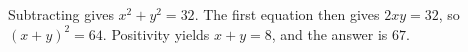 Subtracting gives $x^2+y^2=32$. The first equation then gives $2xy=32$, so $(x+y)^2=64$. Positivity yields $x+y=8$, and the answer is $\boxed{67}$.
